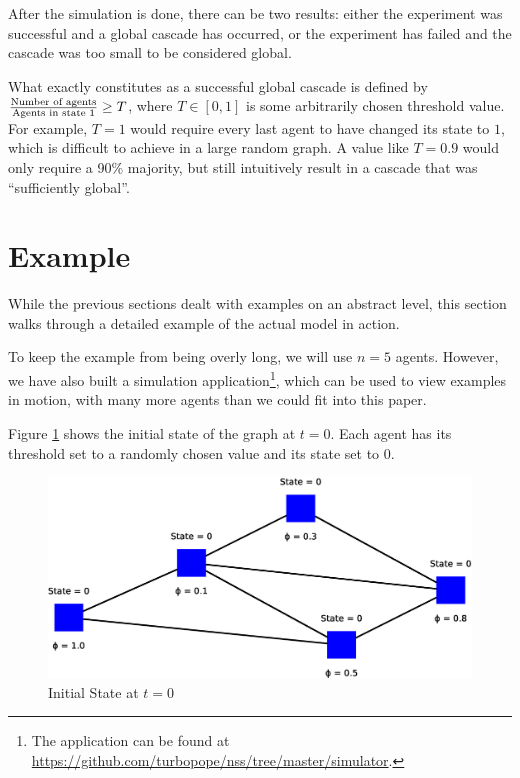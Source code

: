 \documentclass{sig-alternate-05-2015}
\begin{document}
After the simulation is done, there can be two results: either the experiment was successful and a global cascade has occurred, or the experiment has failed and the cascade was too small to be considered global.

What exactly constitutes as a successful global cascade is defined by $\frac{\textmd{Number of agents}}{\textmd{Agents in state } 1} \geq T$, where $T \in [0, 1]$ is some arbitrarily chosen threshold value. For example, $T = 1$ would require every last agent to have changed its state to $1$, which is difficult to achieve in a large random graph. A value like $T = 0.9$ would only require a 90\% majority, but still intuitively result in a cascade that was ``sufficiently global''.


\section{Example}\label{sec:example}

While the previous sections dealt with examples on an abstract level, this section walks through a detailed example of the actual model in action.

To keep the example from being overly long, we will use $n = 5$ agents. However, we have also built a simulation application\footnote{The application can be found at \url{https://github.com/turbopope/nss/tree/master/simulator}.}, which can be used to view examples in motion, with many more agents than we could fit into this paper.

Figure \ref{fig:model1} shows the initial state of the graph at $t = 0$. Each agent has its threshold set to a randomly chosen value and its state set to $0$.

\begin{figure}[h!]
    \includegraphics[width=\columnwidth]{../presentation/img/model4}
    \centering
    \caption{Initial State at $t = 0$}
    \label{fig:model1}
\end{figure}
\end{document}
